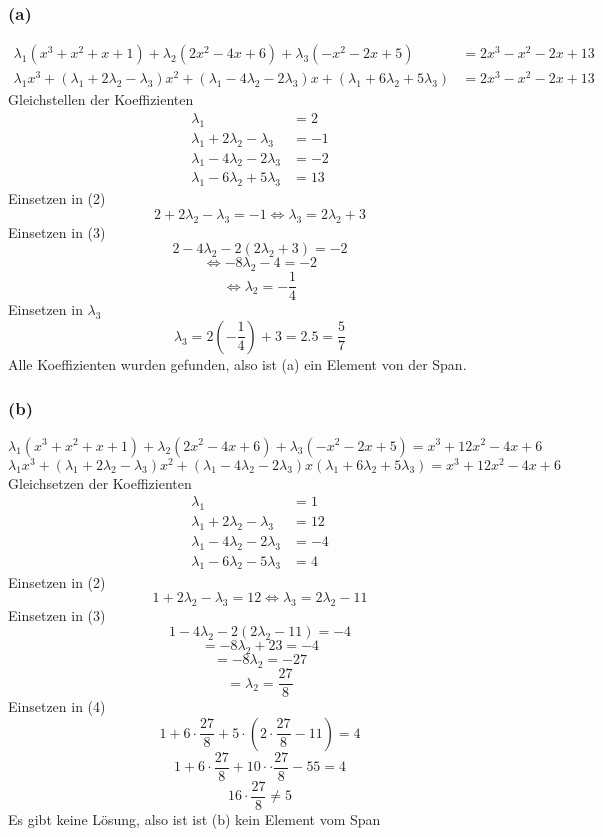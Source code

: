 \documentclass{article}
\begin{document}
\subsubsection*{(a)}
\begin{align*}
    \lambda_1 (x^3 + x^2 + x + 1) + \lambda_2 (2x^2 - 4x + 6) + \lambda_3 (-x^2 - 2x + 5) &= 2x^3 - x^2 - 2x + 13 \\
    \lambda_1 x^3 + (\lambda_1 + 2 \lambda_2 - \lambda_3)x^2 + (\lambda_1 - 4 \lambda_2 - 2 \lambda_3)x + (\lambda_1 + 6 \lambda_2 + 5 \lambda_3) &= 2x^3 - x^2 - 2x + 13
\end{align*}
Gleichstellen der Koeffizienten
\begin{align}
    \lambda_1 &= 2 \\
    \lambda_1 + 2 \lambda_2 - \lambda_3 &= -1 \\
    \lambda_1 - 4\lambda_2 - 2\lambda_3 &= -2 \\
    \lambda_1 - 6\lambda_2 + 5\lambda_3 &= 13 
\end{align}
Einsetzen in (2)
\[2 + 2 \lambda_2 - \lambda_3 = -1 \Leftrightarrow \lambda_3 = 2 \lambda_2 + 3\]
Einsetzen in (3)
\[2 - 4 \lambda_2 - 2 (2 \lambda_2 + 3) = -2\]
\[\Leftrightarrow -8 \lambda_2 - 4 = - 2\]
\[\Leftrightarrow \lambda_2 = - \frac{1}{4}\]
Einsetzen in $\lambda_3$
\[\lambda_3 = 2 (- \frac{1}{4}) + 3 = 2.5 = \frac{5}{7}\]
Alle Koeffizienten wurden gefunden, also ist (a) ein Element von der Span.

\subsubsection*{(b)}
\[\lambda_1(x^3 + x^2 + x + 1) + \lambda_2(2x^2 - 4x + 6) + \lambda_3(-x^2 - 2x + 5) = x^3 + 12x^2 -4x + 6\]
\[\lambda_1 x^3 + (\lambda_1 + 2 \lambda_2 - \lambda_3)x^2 + (\lambda_1 - 4 \lambda_2 - 2 \lambda_3)x (\lambda_1 + 6 \lambda_2 + 5 \lambda_3) = x^3 + 12x^2 - 4x + 6\]
Gleichsetzen der Koeffizienten
\begin{align}
    \lambda_1 &= 1 \\
    \lambda_1 + 2 \lambda_2 - \lambda_3 &= 12 \\
    \lambda_1 - 4 \lambda_2 - 2 \lambda_3 &= -4 \\
    \lambda_1 - 6 \lambda_2 - 5 \lambda_3 &= 4 
\end{align}
Einsetzen in (2)
\[1 + 2 \lambda_2 - \lambda_3 = 12 \Leftrightarrow \lambda_3 = 2 \lambda_2 - 11\]
Einsetzen in (3)
\[1 - 4 \lambda_2 - 2 (2 \lambda_2 - 11) = -4\]
\[= -8 \lambda_2 + 23 = -4\]
\[= -8 \lambda_2 = -27\]
\[= \lambda_2 = \frac{27}{8}\]
Einsetzen in (4)
\[1 + 6 \cdot \frac{27}{8} + 5 \cdot (2 \cdot \frac{27}{8} - 11) = 4\]
\[1 + 6 \cdot \frac{27}{8} + 10 \cdot \cdot \frac{27}{8} - 55 = 4\]
\[16 \cdot \frac{27}{8} \neq 5\]
Es gibt keine Lösung, also ist ist (b) kein Element vom Span
\end{document}
